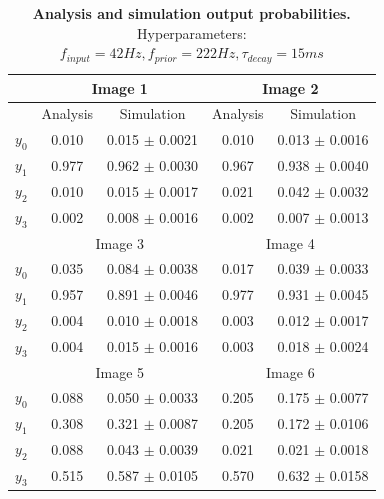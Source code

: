 \begin{table}[]
\centering
\label{tab:1D_42_222_15}
\small
\tabcolsep=0.11cm
\begin{tabular}{|c|cc|cc|}
\hline
                       & \multicolumn{2}{c|}{Image 1}                       & \multicolumn{2}{c|}{Image 2}                       \\ \hline
                       & \multicolumn{1}{c|}{Analysis} & Simulation         & \multicolumn{1}{c|}{Analysis} & Simulation         \\ \hline
$y_0$                  & \multicolumn{1}{c|}{0.010}    & 0.015 $\pm$ 0.0021 & \multicolumn{1}{c|}{0.010}    & 0.013 $\pm$ 0.0016 \\ \hline
$y_1$                  & \multicolumn{1}{c|}{0.977}    & 0.962 $\pm$ 0.0030 & \multicolumn{1}{c|}{0.967}    & 0.938 $\pm$ 0.0040 \\ \hline
$y_2$                  & \multicolumn{1}{c|}{0.010}    & 0.015 $\pm$ 0.0017 & \multicolumn{1}{c|}{0.021}    & 0.042 $\pm$ 0.0032 \\ \hline
$y_3$                  & \multicolumn{1}{c|}{0.002}    & 0.008 $\pm$ 0.0016 & \multicolumn{1}{c|}{0.002}    & 0.007 $\pm$ 0.0013 \\ \hline
                       & \multicolumn{2}{c|}{Image 3}                       & \multicolumn{2}{c|}{Image 4}                       \\ \hline
$y_0$                  & \multicolumn{1}{c|}{0.035}    & 0.084 $\pm$ 0.0038 & \multicolumn{1}{c|}{0.017}    & 0.039 $\pm$ 0.0033 \\ \hline
$y_1$                  & \multicolumn{1}{c|}{0.957}    & 0.891 $\pm$ 0.0046 & \multicolumn{1}{c|}{0.977}    & 0.931 $\pm$ 0.0045 \\ \hline
$y_2$                  & \multicolumn{1}{c|}{0.004}    & 0.010 $\pm$ 0.0018 & \multicolumn{1}{c|}{0.003}    & 0.012 $\pm$ 0.0017 \\ \hline
$y_3$                  & \multicolumn{1}{c|}{0.004}    & 0.015 $\pm$ 0.0016 & \multicolumn{1}{c|}{0.003}    & 0.018 $\pm$ 0.0024 \\ \hline
						& \multicolumn{2}{c|}{Image 5}                       & \multicolumn{2}{c|}{Image 6}                       \\ \hline
$y_0$                  & \multicolumn{1}{c|}{0.088}    & 0.050 $\pm$ 0.0033 & \multicolumn{1}{c|}{0.205}    & 0.175 $\pm$ 0.0077 \\ \hline
$y_1$                  & \multicolumn{1}{c|}{0.308}    & 0.321 $\pm$ 0.0087 & \multicolumn{1}{c|}{0.205}    & 0.172 $\pm$ 0.0106 \\ \hline
$y_2$                  & \multicolumn{1}{c|}{0.088}    & 0.043 $\pm$ 0.0039 & \multicolumn{1}{c|}{0.021}    & 0.021 $\pm$ 0.0018 \\ \hline
$y_3$                  & \multicolumn{1}{c|}{0.515}    & 0.587 $\pm$ 0.0105 & \multicolumn{1}{c|}{0.570}    & 0.632 $\pm$ 0.0158 \\ \hline
\end{tabular}
\caption{\textbf{Analysis and simulation output probabilities. } Hyperparameters: $f_{input} = 42 Hz, f_{prior} = 222 Hz, \tau_{decay} = 15 ms$}
\end{table}

